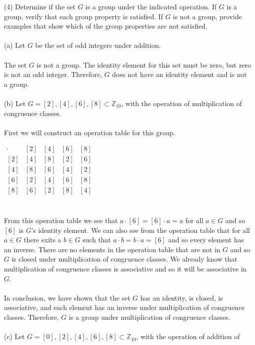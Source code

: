 \documentclass[11pt,a4paper]{article}
\begin{document}
(4) Determine if the set $G$ is a group under the indicated operation. If $G$ is
a group, verify that each group property is satisfied. If $G$ is not a group,
provide examples that show which of the group properties are not satisfied.\\
~\\
(a) Let $G$ be the set of odd integers under addition.\\
~\\
The set $G$ is not a group. The identity element for this set must be zero, but zero is not an odd integer. Therefore, $G$ does not have an identity element and is not a group.\\
~\\
(b) Let $G = {[2], [4], [6], [8]} \subset \mathbb{Z}_{10}$, with the operation of multiplication
of congruence classes.\\
~\\
First we will construct an operation table for this group.
\begin{center}
$
\begin{array}{c|c|c|c|c}
\cdot & [2] & [4] & [6] & [8] \\\hline
[2] & [4] & [8] & [2] & [6] \\\hline
[4] & [8] & [6] & [4] & [2] \\\hline
[6] & [2] & [4] & [6] & [8] \\\hline
[8] & [6] & [2] & [8] & [4] \\
\end{array}
$
\end{center}
~\\
From this operation table we see that $a\cdot [6] = [6]\cdot a = a$ for all $a\in G$ and so $[6]$ is $G$'s identity element. We can also see from the operation table that for all $a \in G$ there exits a $b\in G$ such that $a\cdot b = b\cdot a = [6]$ and so every element has an inverse. There are no elements in the operation table that are not in $G$ and so $G$ is closed under multiplication of congruence classes. We already know that multiplication of congruence classes is associative and so it will be associative in $G$.\\
~\\
In conclusion, we have shown that the set $G$ has an identity, is closed, is associative, and each element has an inverse under multiplication of congruence classes. Therefore, $G$ is a group under multiplication of congruence classes.\\
~\\
(c) Let $G = {[0], [2], [4], [6], [8]} \subset \mathbb{Z}_{10}$, with the operation of addition of
\end{document}
